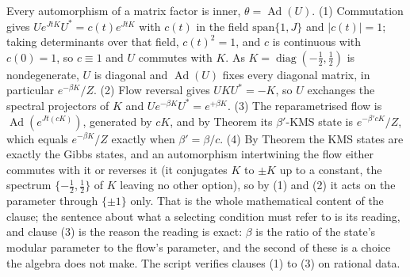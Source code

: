 Every automorphism of a matrix factor is inner, $\theta = \operatorname{Ad}(U)$. (1) Commutation gives $Ue^{JtK}U^{*} = c(t)e^{JtK}$ with $c(t)$ in the field $\mathrm{span}\{1, J\}$ and $|c(t)| = 1$; taking determinants over that field, $c(t)^{2} = 1$, and $c$ is continuous with $c(0) = 1$, so $c \equiv 1$ and $U$ commutes with $K$. As $K = \operatorname{diag}(-\tfrac12, \tfrac12)$ is nondegenerate, $U$ is diagonal and $\operatorname{Ad}(U)$ fixes every diagonal matrix, in particular $e^{-\beta K}/Z$. (2) Flow reversal gives $UKU^{*} = -K$, so $U$ exchanges the spectral projectors of $K$ and $Ue^{-\beta K}U^{*} = e^{+\beta K}$. (3) The reparametrised flow is $\operatorname{Ad}(e^{Jt(cK)})$, generated by $cK$, and by Theorem  its $\beta'$-KMS state is $e^{-\beta' cK}/Z$, which equals $e^{-\beta K}/Z$ exactly when $\beta' = \beta/c$. (4) By Theorem  the KMS states are exactly the Gibbs states, and an automorphism intertwining the flow either commutes with it or reverses it (it conjugates $K$ to $\pm K$ up to a constant, the spectrum $\{-\tfrac12, \tfrac12\}$ of $K$ leaving no other option), so by (1) and (2) it acts on the parameter through $\{\pm 1\}$ only. That is the whole mathematical content of the clause; the sentence about what a selecting condition must refer to is its reading, and clause (3) is the reason the reading is exact: $\beta$ is the ratio of the state's modular parameter to the flow's parameter, and the second of these is a choice the algebra does not make. The script verifies clauses (1) to (3) on rational data.
